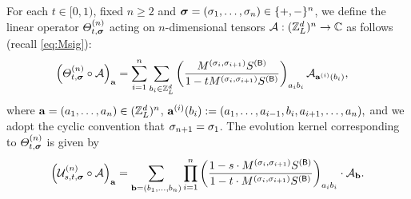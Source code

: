 \begin{definition}\label{DefTHUST}
For each $t\in [0,1)$, fixed $n\ge 2$ and ${\boldsymbol{\sigma}}=(\sigma_1,\ldots,\sigma_n)\in \{+,-\}^n$, we define the linear operator ${\varTheta}^{(n)}_{t, {\boldsymbol{\sigma}}}$ acting on $n$-dimensional tensors ${\mathcal A}: ({\mathbb Z}_L^d)^{n}\to \mathbb C$ as follows (recall \eqref{eq:Msig}):
\begin{align}\label{def:op_thn}
    \left({\varTheta}^{(n)}_{t, {\boldsymbol{\sigma}}} \circ \mathcal{A}\right)_{{\mathbf{a}}} & = \sum_{i=1}^n \sum_{b_i\in{\mathbb Z}_L^d} \left(\frac{M^{(\sigma_i,\sigma_{i+1})}S^{({\mathsf{B}})}}{1 - t M^{(\sigma_i,\sigma_{i+1})}S^{({\mathsf{B}})}}\right)_{a_ib_i}  \mathcal{A}_{{\mathbf{a}}^{(i)}(b_i)},
\end{align} 
where ${\mathbf{a}}=(a_1,\ldots, a_n)\in ({\mathbb Z}_L^d)^n$, \({\mathbf{a}}^{(i)}(b_i):= (a_1, \ldots, a_{i-1}, b_i, a_{i+1}, \ldots, a_n),\) and we adopt the cyclic convention that $\sigma_{n+1}=\sigma_1$.  
The evolution kernel corresponding to ${\varTheta}^{(n)}_{t, {\boldsymbol{\sigma}}}$ is given by
    \begin{align}\label{def_Ustz}
        \left(\mathcal{U}_{s, t, {\boldsymbol{\sigma}}}^{(n)} \circ \mathcal{A}\right)_{{\mathbf{a}}} = \sum_{\mathbf{b} = (b_1, \ldots, b_{n})} \prod_{i=1}^n \left(\frac{1 - s \cdot M^{(\sigma_i,\sigma_{i+1})} S^{({\mathsf{B}})} }{1 - t \cdot M^{(\sigma_i,\sigma_{i+1})} S^{({\mathsf{B}})}}\right)_{a_i b_i} \cdot \mathcal{A}_{\mathbf{b}} . 
    \end{align}
\end{definition}


